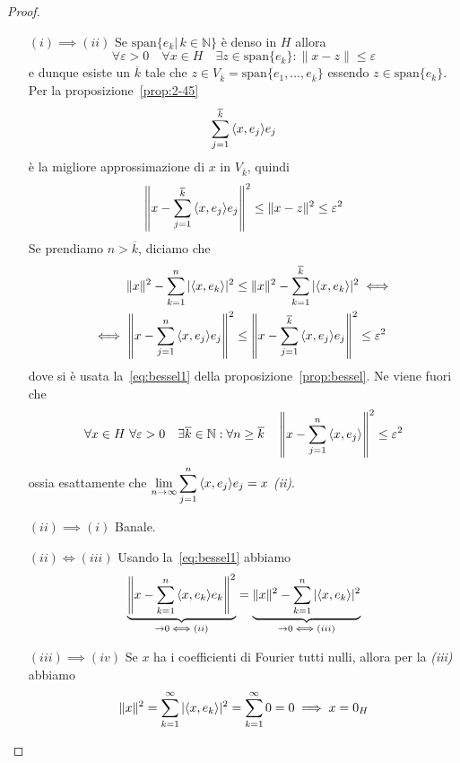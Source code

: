 \begin{proof} \(\)
    \begin{enumerate}
        \item [\((i) \implies (ii)\)]
        Se \(\mathrm{span}
        \{e_{k} | \, k \in \mathbb{N}\} \) è denso in \(H\) allora 
        \[
          \forall \varepsilon > 0 \quad \forall x \in H \quad \exists z \in
          \mathrm{span}\{e_{k}\} : \|x - z\| \le \varepsilon
        \]
        e dunque esiste un \(\overline{k}\) tale che \(z \in V_{\overline{k}} =
        \mathrm{span}\{e_{1}, \dots, e_{\overline k}\}  \)
        essendo \(z \in \mathrm{span}\{e_{k}\}\). Per la
        proposizione~\ref{prop:2-45} \[\sum_{j=1}^{\overline{k}} {\left\langle x,
        e_{j}\right\rangle} e_{j}\] è la migliore approssimazione di \(x\) in \(V_{\overline{k}}
        \), quindi 
        \[
          \left\|x - \sum_{j=1}^{\overline{k}} {\left\langle x, e_{j}\right\rangle} e_{j} \right\|^2 \le
          \|x - z\|^2 \le \varepsilon^2
        \]
        Se prendiamo \(n > \overline{k}\), diciamo che
        \begin{align*}
            \|x\|^2 - \sum_{k=1}^{n} |{\left\langle x, e_{k}\right\rangle}|^2 &\le \|x\|^2 -
            \sum_{k=1}^{\overline{k}} |{\left\langle x, e_{k}\right\rangle}|^2 \iff \\ \iff
            \left\|x - \sum_{j=1}^{n} {\left\langle x, e_{j}\right\rangle}e_{j}  \right\|^2 &\le \left\| x
            - \sum_{j=1}^{\overline{k}} {\left\langle x, e_{j}\right\rangle} e_{j} \right\|^2 \le
            \varepsilon^2
        \end{align*} dove si è usata la~\eqref{eq:bessel1} della
        proposizione~\ref{prop:bessel}. Ne viene fuori che 
        \[
          \forall x \in H \,\,\forall \varepsilon > 0 \quad \exists \overline{k} \in \mathbb{N} :
          \forall n \ge \overline{k} \quad \left\|x - \sum_{j=1}^{n} {\left\langle x,
          e_{j}\right\rangle}\right\|^2 \le \varepsilon^2
        \]
        ossia esattamente che \(\displaystyle \lim_{n \to \infty} \sum_{j=1}^{n} {\left\langle x,
        e_{j}\right\rangle} e_{j} = x \)  \textit{(ii)}.

    \item [\((ii) \implies (i)\)] Banale.

    \item [\((ii) \iff (iii)\)] Usando la~\eqref{eq:bessel1} abbiamo
    \[
        \underbrace{\left\| x - \sum_{k=1}^{n} {\left\langle x, e_{k}\right\rangle} e_{k}
        \right\|^2}_{\to 0 \iff (ii)}  =
      \underbrace{\|x\|^2 - \sum_{k=1}^{n} |{\left\langle x, e_{k}\right\rangle} |^2}_{\to 0 \iff
      (iii)} 
    \]
    \item [\((iii) \implies (iv)\)] Se \(x\) ha i coefficienti di Fourier tutti nulli, allora per la
    \textit{(iii)} abbiamo
    \[
      \|x\|^2 = \sum_{k=1}^{\infty} |{\left\langle x, e_{k}\right\rangle} |^2 = \sum_{k=1}^{\infty} 0
      = 0 \implies x = 0_H
    \]


\end{enumerate}
\end{proof}
